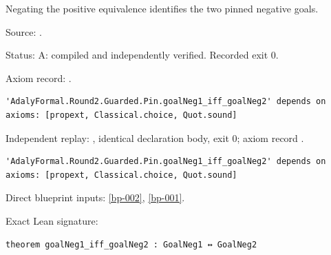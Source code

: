 \begin{theorem}[bp-007]
\label{bp-007}
\leanok
Negating the positive equivalence identifies the two pinned negative goals.

\par Source: \texttt{}.
\par Status: A: compiled and independently verified. Recorded exit 0.
\par Axiom record: \texttt{}.
\begin{verbatim}
'AdalyFormal.Round2.Guarded.Pin.goalNeg1_iff_goalNeg2' depends on axioms: [propext, Classical.choice, Quot.sound]
\end{verbatim}
\par Independent replay: \texttt{}, identical declaration body, exit 0; axiom record \texttt{}.
\begin{verbatim}
'AdalyFormal.Round2.Guarded.Pin.goalNeg1_iff_goalNeg2' depends on axioms: [propext, Classical.choice, Quot.sound]
\end{verbatim}
\par Direct blueprint inputs: \ref{bp-002}, \ref{bp-001}.
\par Exact Lean signature:
\begin{verbatim}
theorem goalNeg1_iff_goalNeg2 : GoalNeg1 ↔ GoalNeg2
\end{verbatim}
\end{theorem}

